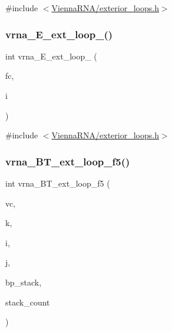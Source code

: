 {\ttfamily \#include $<$\mbox{\hyperlink{exterior__loops_8h}{Vienna\+R\+N\+A/exterior\+\_\+loops.\+h}}$>$}

\mbox{\label{group__loops_ga6e57363a8ff3597cc69181c33fbb8196}} 
\subsubsection{\texorpdfstring{vrna\+\_\+\+E\+\_\+ext\+\_\+loop\+\_()}{vrna\_E\_ext\_loop\_3()}}
{\footnotesize\ttfamily int vrna\+\_\+\+E\+\_\+ext\+\_\+loop\+\_ (\begin{DoxyParamCaption}\item[{\mbox{\hyperlink{group__fold__compound_ga1b0cef17fd40466cef5968eaeeff6166}{vrna\+\_\+fold\+\_\+compound\+\_\+t}} $\ast$}]{fc,  }\item[{int}]{i }\end{DoxyParamCaption})}



{\ttfamily \#include $<$\mbox{\hyperlink{exterior__loops_8h}{Vienna\+R\+N\+A/exterior\+\_\+loops.\+h}}$>$}

\mbox{\label{group__loops_ga55074e49f49ac4cd71395b1bb7a35f5b}} 
\subsubsection{\texorpdfstring{vrna\+\_\+\+B\+T\+\_\+ext\+\_\+loop\+\_\+f5()}{vrna\_BT\_ext\_loop\_f5()}}
{\footnotesize\ttfamily int vrna\+\_\+\+B\+T\+\_\+ext\+\_\+loop\+\_\+f5 (\begin{DoxyParamCaption}\item[{\mbox{\hyperlink{group__fold__compound_ga1b0cef17fd40466cef5968eaeeff6166}{vrna\+\_\+fold\+\_\+compound\+\_\+t}} $\ast$}]{vc,  }\item[{int $\ast$}]{k,  }\item[{int $\ast$}]{i,  }\item[{int $\ast$}]{j,  }\item[{\mbox{\hyperlink{group__data__structures_gaa651bda42e7692f08cb603cd6834b0ee}{vrna\+\_\+bp\+\_\+stack\+\_\+t}} $\ast$}]{bp\+\_\+stack,  }\item[{int $\ast$}]{stack\+\_\+count }\end{DoxyParamCaption})}



